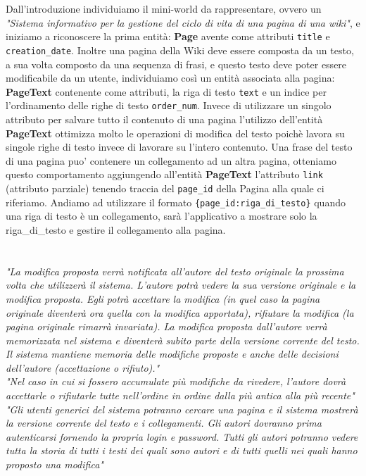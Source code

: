 \documentclass{article}
\begin{document}
	
	Dall'introduzione individuiamo il mini-world da rappresentare, ovvero un \textit{"Sistema informativo per la gestione del ciclo di vita di una pagina di una wiki"}, e iniziamo a riconoscere la prima entità:
	\textbf{Page} avente come attributi \texttt{title} e \texttt{creation\_date}. 
	Inoltre una pagina della Wiki deve essere composta da un testo, a sua volta composto da una sequenza di frasi, e questo testo deve poter essere modificabile da un utente, individuiamo cos\`i un entità associata alla pagina: \textbf {PageText} contenente come attributi, la riga di testo \texttt{text} e un indice per l'ordinamento delle righe di testo \texttt{order\_num}. Invece di utilizzare un singolo attributo per salvare tutto il contenuto di una pagina l'utilizzo dell'entità \textbf{PageText} ottimizza molto le operazioni di modifica del testo poich\`e lavora su singole righe di testo invece di lavorare su l'intero contenuto.
	Una frase del testo di una pagina puo' contenere un collegamento ad un altra pagina, otteniamo questo comportamento aggiungendo all'entità \textbf{PageText} l'attributo \texttt{link} (attributo parziale) tenendo traccia del \texttt{page\_id} della Pagina alla quale ci riferiamo. Andiamo ad utilizzare il formato \texttt{\{page\_id:riga\_di\_testo\}} quando una riga di testo è un collegamento, sarà l'applicativo a mostrare solo la riga\_di\_testo e gestire il collegamento alla pagina.
	\\\\\\
	{\itshape "La modifica proposta verrà notificata all’autore del testo originale la prossima volta che utilizzerà il sistema.
	L’autore potrà vedere la sua versione originale e la modifica proposta. Egli potrà accettare la modifica (in
	quel caso la pagina originale diventerà ora quella con la modifica apportata), rifiutare la modifica (la pagina
	originale rimarrà invariata). La modifica proposta dall’autore verrà memorizzata nel sistema e diventerà
	subito parte della versione corrente del testo. Il sistema mantiene memoria delle modifiche proposte e anche
	delle decisioni dell’autore (accettazione o rifiuto)."}
	\vspace{0.5cm}
	\\
	{\itshape "Nel caso in cui si fossero accumulate più modifiche da rivedere, l’autore dovrà accettarle o rifiutarle tutte
	nell’ordine in ordine dalla più antica alla più recente"}
	\vspace{0.5cm}
	\\
	{\itshape "Gli utenti generici del sistema potranno cercare una pagina e il sistema mostrerà la versione corrente del
	testo e i collegamenti.
	Gli autori dovranno prima autenticarsi fornendo la propria login e password. Tutti gli autori potranno vedere
	tutta la storia di tutti i testi dei quali sono autori e di tutti quelli nei quali hanno proposto una modifica"}
	\vspace{0.5cm}
	
\end{document}
